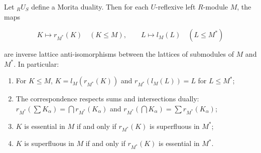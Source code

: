 Let ${}_R U_S$ define a Morita duality. Then for each $U$-reflexive left $R$-module $M$, the maps

$$K \mapsto r_{M^*}(K) \quad (K \leq M), \qquad L \mapsto l_M(L) \quad (L \leq M^*)$$

are inverse lattice anti-isomorphisms between the lattices of submodules of $M$ and $M^*$. In particular:

\begin{enumerate}
\item[(1)] For $K \leq M$, $K = l_M(r_{M^*}(K))$ and $r_{M^*}(l_M(L)) = L$ for $L \leq M^*$;
\item[(2)] The correspondence respects sums and intersections dually: $r_{M^*}(\sum K_\alpha) = \bigcap r_{M^*}(K_\alpha)$ and $r_{M^*}(\bigcap K_\alpha) = \sum r_{M^*}(K_\alpha)$;
\item[(3)] $K$ is essential in $M$ if and only if $r_{M^*}(K)$ is superfluous in $M^*$;
\item[(4)] $K$ is superfluous in $M$ if and only if $r_{M^*}(K)$ is essential in $M^*$.
\end{enumerate}
